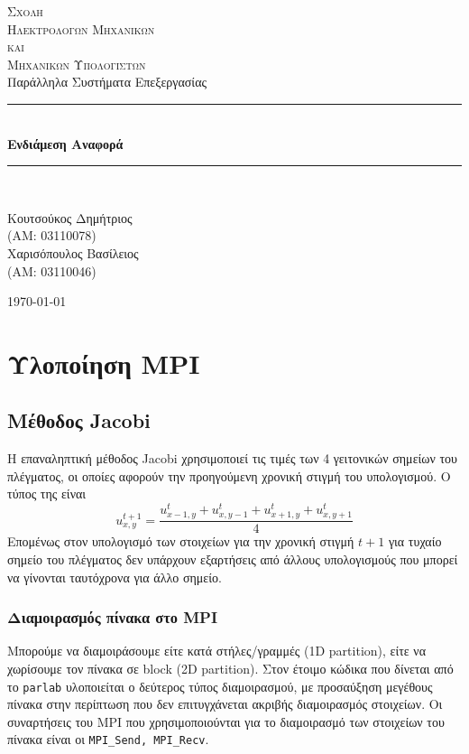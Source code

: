\documentclass[11pt,a4paper]{article}
\newcommand{\HRule}{\rule{\linewidth}{0.5mm}}
\begin{document}
\begin{titlepage}
\centering


\textsc{\LARGE Σχολη \\ Ηλεκτρολογων Μηχανικων \\[-3pt] και \\[6pt] Μηχανικων Υπολογιστων}\\[1.5cm]
{\Large Παράλληλα Συστήματα Επεξεργασίας}\\[0.5cm]

\HRule \\[0.5cm]
{\huge \bfseries Ενδιάμεση Αναφορά}\\[0.2cm]
\HRule \\[1.5cm]

\begin{minipage}{0.4\textwidth}
\large
Κουτσούκος Δημήτριος \\
(ΑΜ: 03110078) \\
Χαρισόπουλος Βασίλειος \\
(ΑΜ: 03110046)
\end{minipage}

\vfill

{\large \today}
\end{titlepage}

\clearpage
\clearpage
\newpage
\section{Υλοποίηση MPI}
\subsection{Μέθοδος Jacobi}
Η επαναληπτική μέθοδος Jacobi χρησιμοποιεί τις τιμές των 4 γειτονικών σημείων του πλέγματος, οι οποίες αφορούν την προηγούμενη χρονική στιγμή του υπολογισμού. Ο τύπος της είναι
\[ u_{x,y}^{t+1} = \frac{u_{x-1,y}^t + u_{x,y-1}^t + u_{x+1, y}^t + u_{x, y+1}^t}{4} \]
Επομένως στον υπολογισμό των στοιχείων για την χρονική στιγμή $t+1$ για τυχαίο σημείο του πλέγματος δεν υπάρχουν εξαρτήσεις από άλλους υπολογισμούς που μπορεί να γίνονται ταυτόχρονα για άλλο σημείο.
\subsubsection{Διαμοιρασμός πίνακα στο MPI}
Μπορούμε να διαμοιράσουμε είτε κατά στήλες/γραμμές (1D partition), είτε να χωρίσουμε τον πίνακα σε block (2D partition). Στον έτοιμο κώδικα που δίνεται από το \texttt{parlab} υλοποιείται ο δεύτερος τύπος διαμοιρασμού, με προσαύξηση μεγέθους πίνακα στην περίπτωση που δεν επιτυγχάνεται ακριβής διαμοιρασμός στοιχείων.  Οι συναρτήσεις του MPI που χρησιμοποιούνται για το διαμοιρασμό των στοιχείων του πίνακα είναι οι \texttt{MPI\_Send, MPI\_Recv}.
\end{document}

